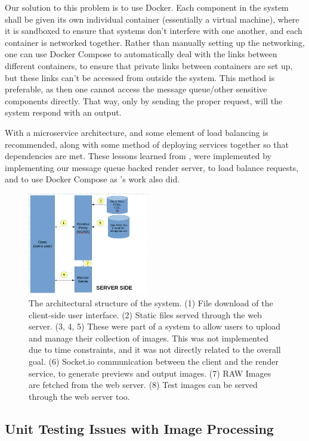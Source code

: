 \documentclass[10pt,a4paper]{article}
\begin{document}
Our solution to this problem is to use Docker. Each component in the system shall be given its own individual container (essentially a virtual machine), where
it is sandboxed to ensure that systems don't interfere with one another, and each container is networked together. Rather than manually setting up the networking,
one can use Docker Compose to automatically deal with the links between different containers, to ensure that private links between containers are set up, but these links
can't be accessed from outside the system. This method is preferable, as then one cannot access the message queue/other sensitive components directly. That way, only by sending
the proper request, will the system respond with an output. 

With a microservice architecture, and some element of load balancing is recommended, along with some method of deploying services together so that dependencies
are met. These lessons learned from \cite{Docker}, were implemented by implementing our message queue backed render server, to load balance requests,
and to use Docker Compose as \citeauthor{Docker}'s work also did.


\begin{figure}
\centering
\includegraphics[width=200px]{architecture}
\caption{The architectural structure of the system. (1) File download of the client-side user interface. (2) Static files served through the web server.
(3, 4, 5) These were part of a system to allow users to upload and manage their collection of images. This was not implemented due to time constraints, and it was not directly related to the overall goal. (6) Socket.io communication
between the client and the render service, to generate previews and output images. (7) RAW Images are fetched from the web server.  (8) Test images can be served through the web server too.}
\end{figure}
\subsection{Unit Testing Issues with Image Processing}
\end{document}
